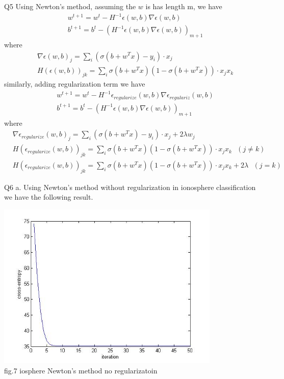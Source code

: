 \documentclass[12pt]{article}
\newenvironment{problem}[2][Problem]{\begin{trivlist}
\item[\hskip \labelsep {\bfseries #1}\hskip \labelsep {\bfseries #2}]}{\end{trivlist}}
\begin{document}
\begin{problem} {3.2 Newton's Method}
\item{Q5}
Using Newton's method, assuming the $w$ is has length m, we have
	\begin{align*}
			&w^{t+1} = w^t - H^{-1}\epsilon(w, b) \nabla \epsilon(w, b) \\
			&b^{t+1} = b^t - (H^{-1}\epsilon(w, b) \nabla \epsilon(w, b))_{m+1}
	\end{align*}
where
	\begin{align*}
		&\nabla \epsilon(w, b)_j = \sum_i (\sigma(b+w^Tx) - y_i) \cdot x_j \\
		&H(\epsilon(w, b))_{jk} = \sum_i \sigma(b+w^Tx)(1-\sigma(b+w^Tx)) \cdot x_jx_k
	\end{align*}
similarly, adding regularization term we have
	\begin{align*}
			&w^{t+1} = w^t - H^{-1}\epsilon_{regularize}(w, b) \nabla \epsilon_{regulariz}(w, b) \\
			&b^{t+1} = b^t - (H^{-1}\epsilon(w, b) \nabla \epsilon(w, b))_{m+1}
	\end{align*}
where
	\begin{align*}
		&\nabla \epsilon_{regularize}(w, b)_j = \sum_i (\sigma(b+w^Tx) - y_i) \cdot x_j + 2 \lambda w_j \\
		&H(\epsilon_{regularize}(w, b))_{jk} = \sum_i \sigma(b+w^Tx)(1-\sigma(b+w^Tx)) \cdot x_jx_k \ \ \ (j \neq k)\\
		&H(\epsilon_{regularize}(w, b))_{jk} = \sum_i \sigma(b+w^Tx)(1-\sigma(b+w^Tx)) \cdot x_jx_k + 2 \lambda \ \ \ (j = k)
	\end{align*}
\item{Q6 a.}
Using Newton's method without regularization in ionosphere classification we have the following result.
\begin{center}
		\includegraphics[height=8cm]{ionosphere_newtons.jpg}{\\fig.7 iosphere Newton's method no regularizatoin}

\end{center}
\end{problem}
\end{document}
